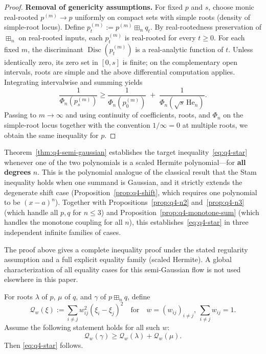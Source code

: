 \begin{proof}
\textbf{Removal of genericity assumptions.}
For fixed $p$ and $s$, choose monic real-rooted $p^{(m)}\to p$ uniformly on
compact sets with simple roots (density of simple-root locus).
Define $p_t^{(m)}:=p^{(m)}\boxplus_n q_t$.
By real-rootedness preservation of $\boxplus_n$ on real-rooted inputs,
each $p_t^{(m)}$ is real-rooted for every $t\ge 0$.
For each fixed $m$, the discriminant
$\operatorname{Disc}(p_t^{(m)})$ is a real-analytic function of $t$.
Unless identically zero, its zero set in $[0,s]$ is finite; on the complementary
open intervals, roots are simple and the above differential computation applies.
Integrating intervalwise and summing yields
\[
\frac{1}{\Phi_n(p_s^{(m)})}
\ge
\frac{1}{\Phi_n(p_0^{(m)})}
\;+\;
\frac{1}{\Phi_n(\sqrt{s}\,\mathrm{He}_n)}.
\]
Passing to $m\to\infty$ and using continuity of coefficients, roots, and $\Phi_n$
on the simple-root locus together with the convention $1/\infty=0$ at multiple roots,
we obtain the same inequality for $p$.
\end{proof}

\begin{remark}
Theorem~\ref{thm:q4-semi-gaussian} establishes
the target inequality~\eqref{eq:q4-star} whenever one of the two
polynomials is a scaled Hermite polynomial---for \textbf{all degrees} $n$.
This is the polynomial analogue of the classical result that the
Stam inequality holds when one summand is Gaussian, and it strictly
extends the degenerate shift case (Proposition~\ref{prop:q4-shift},
which requires one polynomial to be $(x-a)^n$).
Together with Propositions~\ref{prop:q4-n2} and~\ref{prop:q4-n3}
(which handle all $p,q$ for $n\le 3$) and
Proposition~\ref{prop:q4-monotone-sum}
(which handles the monotone coupling for all $n$),
this establishes~\eqref{eq:q4-star} in three independent
infinite families of cases.
\end{remark}

\begin{remark}
The proof above gives a complete inequality proof under the stated
regularity assumption and a full explicit equality family (scaled Hermite).
A global characterization of all equality cases for this semi-Gaussian flow
is not used elsewhere in this paper.
\end{remark}


\begin{proposition}\label{prop:q4-reductionA}
For roots $\lambda$ of $p$, $\mu$ of $q$, and $\gamma$ of $p\boxplus_n q$, define
\[
\mathcal Q_w(\xi):=\sum_{i\neq j} w_{ij}^2(\xi_i-\xi_j)^2
\quad\text{for}\quad
w=(w_{ij})_{i\neq j},\ \sum_{i\neq j}w_{ij}=1.
\]
Assume the following statement holds for all such $w$:
\[
\mathcal Q_w(\gamma)\ge \mathcal Q_w(\lambda)+\mathcal Q_w(\mu).
\tag{A}\label{eq:q4-A}
\]
Then \eqref{eq:q4-star} follows.
\end{proposition}

